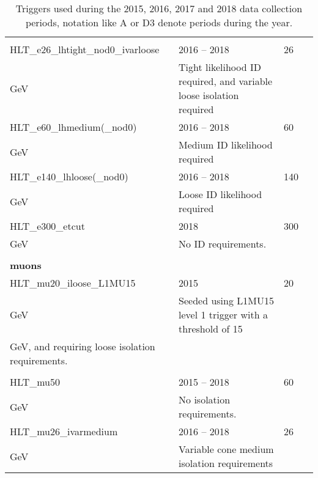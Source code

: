 \begin{table}[ht]
\begin{center}
{\begin{tabular}{ l l l p{7cm} }
                                &&&\\
        HLT\_e26\_lhtight\_nod0\_ivarloose & 2016 -- 2018 & 26 \\GeV & Tight likelihood ID required, and variable loose isolation required\\
        HLT\_e60\_lhmedium(\_nod0) & 2016 -- 2018 & 60 \\GeV & Medium ID likelihood required\\
        HLT\_e140\_lhloose(\_nod0) & 2016 -- 2018 & 140 \\GeV & Loose ID likelihood required\\
        HLT\_e300\_etcut & 2018 & 300 \\GeV & No ID requirements. \\
                                &&&\\
        \multicolumn{4}{l}{\bfseries{muons}}\\
        HLT\_mu20\_iloose\_L1MU15 & 2015 & 20 \\GeV & Seeded using L1MU15 level 1 trigger with a threshold of 15 \\GeV, and requiring loose isolation requirements.\\
                                &&&\\
        HLT\_mu50\ & 2015 -- 2018 & 60 \\GeV  & No isolation requirements. \\
        HLT\_mu26\_ivarmedium & 2016 -- 2018 & 26 \\GeV & Variable cone medium isolation requirements \\
        \bottomrule
      \end{tabular}
    }
    \caption{ Triggers used during the 2015, 2016, 2017 and 2018 data collection
      periods, notation like A or D3 denote periods during the year. }
    \label{tab:triggers}
  \end{center}
\end{table}